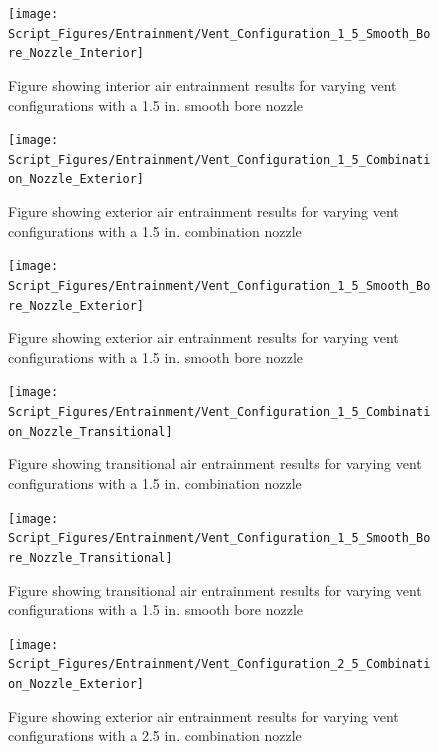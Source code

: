 \documentclass{article}
\begin{document}
\begin{appendices}
\clearpage

\begin{figure}[!ht]
\centering
\texttt{[image: Script\_Figures/Entrainment/Vent\_Configuration\_1\_5\_Smooth\_Bore\_Nozzle\_Interior]}
\caption{Figure showing interior air entrainment results for varying vent configurations with a 1.5 in. smooth bore nozzle}
\label{fig:1_5_Interior_Smooth_Bore_Vent_Config}
\end{figure}

\clearpage

\begin{figure}[!ht]
\centering
\texttt{[image: Script\_Figures/Entrainment/Vent\_Configuration\_1\_5\_Combination\_Nozzle\_Exterior]}
\caption{Figure showing exterior air entrainment results for varying vent configurations with a 1.5 in. combination nozzle}
\label{fig:1_5_Exterior_Combination_Vent_Config}
\end{figure}

\clearpage

\begin{figure}[!ht]
\centering
\texttt{[image: Script\_Figures/Entrainment/Vent\_Configuration\_1\_5\_Smooth\_Bore\_Nozzle\_Exterior]}
\caption{Figure showing exterior air entrainment results for varying vent configurations with a 1.5 in. smooth bore nozzle}
\label{fig:1_5_Exterior_Smooth_Bore_Vent_Config}
\end{figure}

\clearpage

\begin{figure}[!ht]
\centering
\texttt{[image: Script\_Figures/Entrainment/Vent\_Configuration\_1\_5\_Combination\_Nozzle\_Transitional]}
\caption{Figure showing transitional air entrainment results for varying vent configurations with a 1.5 in. combination nozzle}
\label{fig:1_5_Transitional_Combination_Vent_Config}
\end{figure}

\clearpage

\begin{figure}[!ht]
\centering
\texttt{[image: Script\_Figures/Entrainment/Vent\_Configuration\_1\_5\_Smooth\_Bore\_Nozzle\_Transitional]}
\caption{Figure showing transitional air entrainment results for varying vent configurations with a 1.5 in. smooth bore nozzle}
\label{fig:1_5_Transitional_Smooth_Bore_Vent_Config}
\end{figure}

\clearpage

\begin{figure}[!ht]
\centering
\texttt{[image: Script\_Figures/Entrainment/Vent\_Configuration\_2\_5\_Combination\_Nozzle\_Exterior]}
\caption{Figure showing exterior air entrainment results for varying vent configurations with a 2.5 in. combination nozzle}
\label{fig:2_5_Exterior_Combination_Vent_Config}
\end{figure}


\end{appendices}
\end{document}
